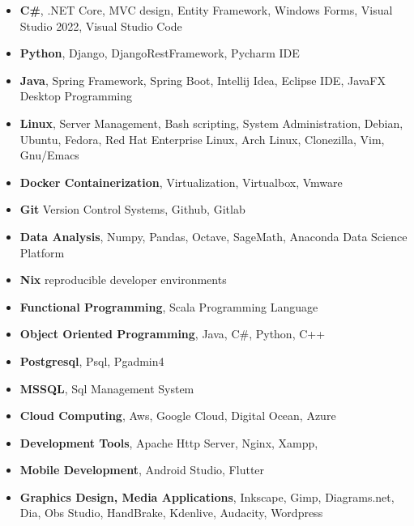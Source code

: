 \documentclass[line,margin]{res}
\begin{document}
\begin{resume}
                 \begin{itemize}  \itemsep -2pt %
                   \item \textbf{C\#}, .NET Core, MVC design, Entity Framework, Windows Forms, Visual Studio 2022, Visual Studio Code
                   \item \textbf{Python}, Django, DjangoRestFramework, Pycharm IDE
                   \item \textbf{Java}, Spring Framework, Spring Boot, Intellij Idea, Eclipse IDE, JavaFX Desktop Programming
                   \item \textbf{Linux}, Server Management, Bash scripting, System Administration, Debian, Ubuntu, Fedora, Red Hat Enterprise Linux, Arch Linux, Clonezilla, Vim, Gnu/Emacs
                   \item \textbf{Docker Containerization}, Virtualization, Virtualbox, Vmware
                   \item \textbf{Git} Version Control Systems, Github, Gitlab
                   \item \textbf{Data Analysis}, Numpy, Pandas, Octave, SageMath, Anaconda Data Science Platform 
                   \item \textbf{Nix} reproducible developer environments
                   \item \textbf{Functional Programming}, Scala Programming Language 
                   \item \textbf{Object Oriented Programming}, Java, C\#, Python, C++ 
                   \item \textbf{Postgresql}, Psql, Pgadmin4 
                   \item \textbf{MSSQL}, Sql Management System 
                   \item \textbf{Cloud Computing}, Aws, Google Cloud, Digital Ocean, Azure
                   \item \textbf{Development Tools}, Apache Http Server, Nginx, Xampp, 
                   \item \textbf{Mobile Development}, Android Studio, Flutter
                   \item \textbf{Graphics Design, Media Applications}, Inkscape, Gimp, Diagrams.net, Dia, Obs Studio, HandBrake, Kdenlive, Audacity, Wordpress
 

\end{itemize}
\end{resume}
\end{document}
